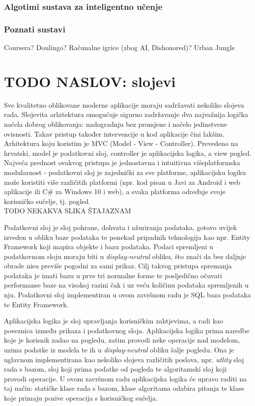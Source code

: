 \documentclass[times, utf8, zavrsni]{fer}
\begin{document}
\subsection{Algotimi sustava za inteligentno učenje}

\subsection{Poznati sustavi}
Coursera? Doulingo? Računalne igrice (zbog AI, Dishonored)? Urban Jungle

\chapter{ TODO NASLOV: slojevi}
Sve kvalitetno oblikovane moderne aplikacije moraju sadržavati nekoliko slojeva rada. Slojevita arhitektura omogućuje sigurno zadržavanje dva najvažnija logička načela dobrog oblikovanja: nadogradnju bez promjene i načelo jedinstvene ovisnosti. Takav pristup također intervencije u kod aplikacije čini lakšim. Arhitektura koju koristim je MVC (Model - View - Controller). Prevedeno na hrvatski, model je podatkovni sloj, controller je aplikacijska logika, a view pogled. Najveća prednost ovakvog pristupa je jednostavna i intuitivna višeplatformska modularnost - podatkovni sloj je zajednički za sve platforme, aplikacijsku logiku može koristiti više različitih platformi (npr. kod pisan u Javi za Android i web aplikacije ili C\# za Windows 10 i web), a svaka platforma određuje svoje korisničko sučelje, tj. pogled.
\\TODO NEKAKVA SLIKA ŠTAJAZNAM
\par
Podatkovni sloj je sloj pohrane, dohvata i ažuriranja podataka, gotovo uvijek izveden u obliku baze podataka te ponekad pripadnih tehnologija kao npr. Entity Framework koji mapira objekte i bazu podataka. Podaci spremljeni u podatkovnom sloju moraju biti u \textit{display-neutral} obliku, što znači da bez daljnje obrade nisu previše pogodni za sami prikaz. Cilj takvog pristupa spremanja podataka je imati bazu u prve tri normalne forme te posljedično očuvati performanse baze na visokoj razini čak i uz veću količinu podataka spremljenih u nju. Podatkovni sloj implementiran u ovom završnom radu je SQL baza podataka te Entity Framework.
\par
Aplikacijska logika je sloj upravljanja korisničkim zahtjevima, a radi kao poveznica između prikaza i podatkovnog sloja. Aplikacijska logika prima naredbe koje je korisnik zadao na pogledu, zatim provodi neke operacije nad modelom, uzima podatke iz modela te ih u \textit{display-neutral} obliku šalje pogledu. Ona je uglavnom implementirana kao nekoliko slojeva različitih poslova, npr. \textit{utlity} sloj rada s bazom, sloj koji prima podatke od pogleda te algoritamski sloj koji provodi operacije. U ovom završnom radu aplikacijska logika će upravo raditi na taj način: statičke klase rada s bazom, klase algoritama odabira pitanja te klase koje primaju pozive operacija s korisničkog sučelja.
\end{document}
